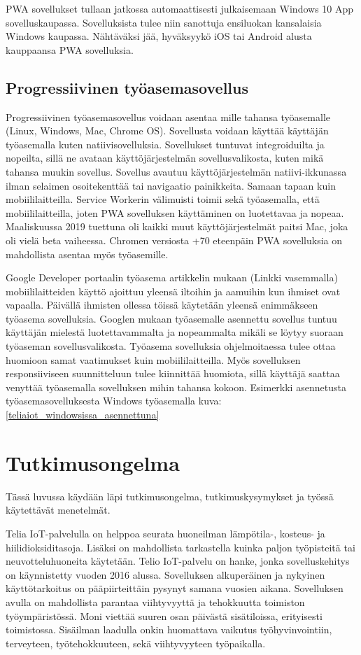 \documentclass{tktltiki}
\begin{document}
PWA sovellukset tullaan jatkossa automaattisesti julkaisemaan Windows 10 App sovelluskaupassa. \cite{Rossi} Sovelluksista tulee niin sanottuja ensiluokan kansalaisia Windows kaupassa. Nähtäväksi jää, hyväksyykö iOS tai Android alusta kauppaansa PWA sovelluksia.

\subsection{Progressiivinen työasemasovellus} 

Progressiivinen työasemasovellus voidaan asentaa mille tahansa työasemalle (Linux, Windows, Mac, Chrome OS). Sovellusta voidaan käyttää käyttäjän työasemalla kuten natiivisovelluksia. Sovellukset tuntuvat integroiduilta ja nopeilta, sillä ne avataan käyttöjärjestelmän sovellusvalikosta, kuten mikä tahansa muukin sovellus. Sovellus avautuu käyttöjärjestelmän natiivi-ikkunassa ilman selaimen osoitekenttää tai navigaatio painikkeita. Samaan tapaan kuin mobiililaitteilla. Service Workerin välimuisti toimii sekä työasemalla, että mobiililaitteilla, joten PWA sovelluksen käyttäminen on luotettavaa ja nopeaa. Maaliskuussa 2019 tuettuna oli kaikki muut käyttöjärjestelmät paitsi Mac, joka oli vielä beta vaiheessa. Chromen versiosta +70 eteenpäin PWA sovelluksia on mahdollista asentaa myös työasemille. 

Google Developer portaalin työasema artikkelin mukaan \cite{Google}(Linkki vasemmalla) mobiililaitteiden käyttö ajoittuu yleensä iltoihin ja aamuihin kun ihmiset ovat vapaalla. Päivällä ihmisten ollessa töissä käytetään yleensä enimmäkseen työasema sovelluksia. Googlen mukaan työasemalle asennettu sovellus tuntuu käyttäjän mielestä luotettavammalta ja nopeammalta mikäli se löytyy suoraan työaseman sovellusvalikosta. Työasema sovelluksia ohjelmoitaessa tulee ottaa huomioon samat vaatimukset kuin mobiililaitteilla. Myös sovelluksen responsiiviseen suunnitteluun tulee kiinnittää huomiota, sillä käyttäjä saattaa venyttää työasemalla sovelluksen mihin tahansa kokoon. Esimerkki asennetusta työasemasovelluksesta Windows työasemalla kuva: \ref{teliaiot_windowsissa_asennettuna}

\newpage
\section{Tutkimusongelma}

Tässä luvussa käydään läpi tutkimusongelma, tutkimuskysymykset ja työssä käytettävät menetelmät.

Telia IoT-palvelulla on helppoa seurata huoneilman lämpötila-, kosteus- ja hiilidioksiditasoja. Lisäksi on mahdollista tarkastella kuinka paljon työpisteitä tai neuvotteluhuoneita käytetään. Telio IoT-palvelu on hanke, jonka sovelluskehitys on käynnistetty vuoden 2016 alussa. Sovelluksen alkuperäinen ja nykyinen käyttötarkoitus on pääpiirteittäin pysynyt samana vuosien aikana. Sovelluksen avulla on mahdollista parantaa viihtyvyyttä ja tehokkuutta toimiston työympäristössä. Moni viettää suuren osan päivästä sisätiloissa, erityisesti toimistossa. Sisäilman laadulla onkin huomattava vaikutus työhyvinvointiin, terveyteen, työtehokkuuteen, sekä viihtyvyyteen työpaikalla. 
\end{document}
